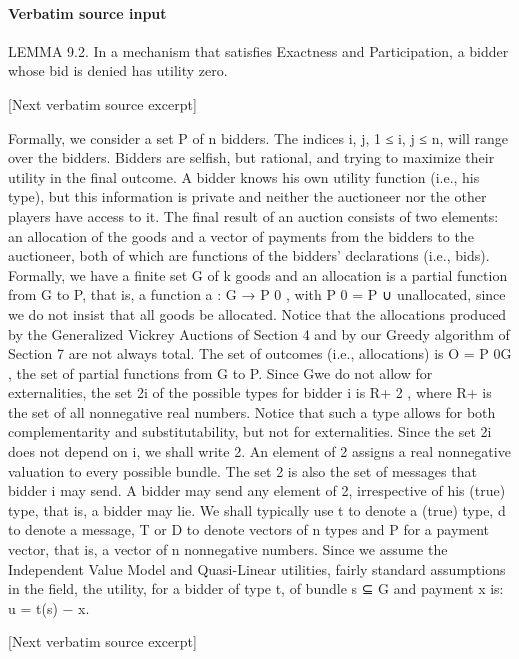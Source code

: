 \documentclass[10pt]{article}
\begin{document}
\paragraph{Verbatim source input}
\begin{ReviewVerbatim}
LEMMA 9.2. In a mechanism that satisfies Exactness and Participation, a
bidder whose bid is denied has utility zero.

[Next verbatim source excerpt]

Formally, we consider a set P of n bidders. The indices i, j, 1 ≤ i, j ≤ n, will
range over the bidders. Bidders are selfish, but rational, and trying to maximize their
utility in the final outcome. A bidder knows his own utility function (i.e., his type),
but this information is private and neither the auctioneer nor the other players have
access to it. The final result of an auction consists of two elements: an allocation
of the goods and a vector of payments from the bidders to the auctioneer, both of
which are functions of the bidders’ declarations (i.e., bids). Formally, we have a
finite set G of k goods and an allocation is a partial function from G to P, that is, a
function a : G → P 0 , with P 0 = P ∪ {unallocated}, since we do not insist that all
goods be allocated. Notice that the allocations produced by the Generalized Vickrey
Auctions of Section 4 and by our Greedy algorithm of Section 7 are not always
total. The set of outcomes (i.e., allocations) is O = P 0G , the set of partial functions
from G to P. Since Gwe do not allow for externalities, the set 2i of the possible types
for bidder i is R+ 2 , where R+ is the set of all nonnegative real numbers. Notice
that such a type allows for both complementarity and substitutability, but not for
externalities. Since the set 2i does not depend on i, we shall write 2. An element
of 2 assigns a real nonnegative valuation to every possible bundle. The set 2 is
also the set of messages that bidder i may send. A bidder may send any element of
2, irrespective of his (true) type, that is, a bidder may lie. We shall typically use t
to denote a (true) type, d to denote a message, T or D to denote vectors of n types
and P for a payment vector, that is, a vector of n nonnegative numbers.
Since we assume the Independent Value Model and Quasi-Linear utilities, fairly
standard assumptions in the field, the utility, for a bidder of type t, of bundle s ⊆ G
and payment x is:
u = t(s) − x.

[Next verbatim source excerpt]


\end{ReviewVerbatim}
\end{document}
